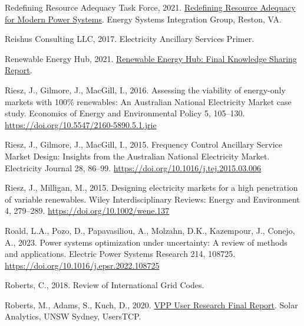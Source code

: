 \documentclass[12pt,a4paper,]{report}
\newlength{\cslhangindent}
\newenvironment{CSLReferences}[2] %
 {%
  \setlength{\parindent}{0pt}
  \ifodd #1 \everypar{\setlength{\hangindent}{\cslhangindent}}\ignorespaces\fi
  \ifnum #2 > 0
  \setlength{\parskip}{#2\baselineskip}
  \fi
 }%
 {}
\begin{document}
\begin{CSLReferences}{1}{0}
\leavevmode{}%
Redefining Resource Adequacy Task Force, 2021.
\href{https://www.esig.energy/wp-content/uploads/2021/08/ESIG-Redefining-Resource-Adequacy-2021.pdf}{Redefining
{Resource Adequacy} for {Modern Power Systems}}. {Energy Systems
Integration Group}, {Reston, VA}.

\leavevmode{}%
Reishus Consulting LLC, 2017. Electricity {Ancillary Services Primer}.

\leavevmode{}%
Renewable Energy Hub, 2021.
\href{https://arena.gov.au/assets/2021/04/renewable-energy-hub-final-report.pdf}{Renewable
{Energy Hub}: {Final Knowledge Sharing Report}}.

\leavevmode{}%
Riesz, J., Gilmore, J., MacGill, I., 2016. Assessing the viability of
energy-only markets with 100\% renewables: {An Australian National
Electricity Market} case study. Economics of Energy and Environmental
Policy 5, 105--130. \url{https://doi.org/10.5547/2160-5890.5.1.jrie}

\leavevmode{}%
Riesz, J., Gilmore, J., MacGill, I., 2015. Frequency {Control Ancillary
Service Market Design}: {Insights} from the {Australian National
Electricity Market}. Electricity Journal 28, 86--99.
\url{https://doi.org/10.1016/j.tej.2015.03.006}

\leavevmode{}%
Riesz, J., Milligan, M., 2015. Designing electricity markets for a high
penetration of variable renewables. Wiley Interdisciplinary Reviews:
Energy and Environment 4, 279--289.
\url{https://doi.org/10.1002/wene.137}

\leavevmode{}%
Roald, L.A., Pozo, D., Papavasiliou, A., Molzahn, D.K., Kazempour, J.,
Conejo, A., 2023. Power systems optimization under uncertainty: {A}
review of methods and applications. Electric Power Systems Research 214,
108725. \url{https://doi.org/10.1016/j.epsr.2022.108725}

\leavevmode{}%
Roberts, C., 2018. Review of {International Grid Codes}.

\leavevmode{}%
Roberts, M., Adams, S., Kuch, D., 2020.
\href{https://www.ceem.unsw.edu.au/sites/default/files/uploads/publications/VPP\%20User\%20Research\%20-\%20Final\%20Report\%20-\%2020201127r.pdf}{{VPP
User Research Final Report}}. {Solar Analytics, UNSW Sydney, UsersTCP}.


\end{CSLReferences}
\end{document}
